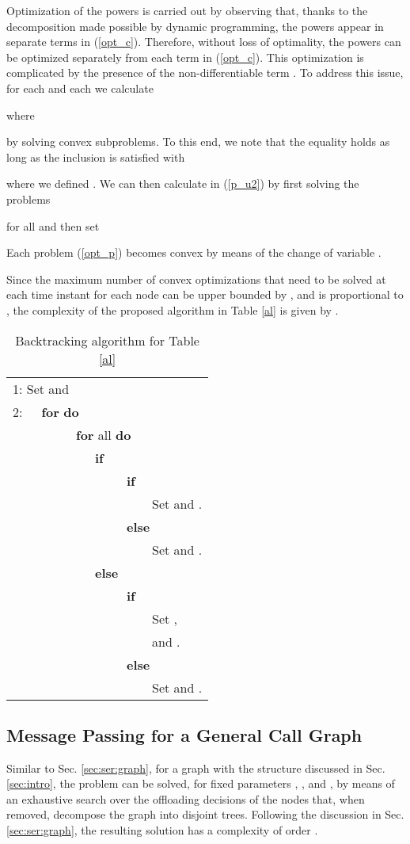 \documentclass[journal,twocolumn,10pt,twoside]{IEEEtranTCOM}
\theoremstyle{plain}
\theoremstyle{plain}
\theoremstyle{remark}
\begin{document}
Optimization of the powers is carried out by observing that, thanks to the decomposition made possible by dynamic programming, the powers   appear in separate terms in (\ref{opt_c}). Therefore, without loss of optimality, the powers  can be optimized separately from each term in (\ref{opt_c}). This optimization is complicated by the presence of the non-differentiable term  . To address this issue, for each  and each  we calculate

where

by solving  convex subproblems. To this end, we note that the equality  holds as long as the inclusion  is satisfied with
 
where we defined . We can then calculate  in (\ref{p_u2}) by first solving the problems

for all  and then set

Each problem (\ref{opt_p}) becomes convex by means of the change of variable  \cite{bar}.

Since the maximum number of convex optimizations that need to be solved at each time instant for each node can be upper bounded by , and  is proportional to , the complexity of the proposed algorithm in Table \ref{al} is given by .
\begin{table}
 \caption{Backtracking algorithm for Table \ref{al}}\label{trace}
\begin{tabular}{l}
\hline
1: Set  and \\
2:~~~\textbf{for}  \textbf{do} \\
~~~~~~~~~~\textbf{for} all  \textbf{do} \\
~~~~~~~~~~~~~\textbf{if} \\
~~~~~~~~~~~~~~~~~~\textbf{if} \\
~~~~~~~~~~~~~~~~~~~~~~Set  and  .\\
~~~~~~~~~~~~~~~~~~\textbf{else}\\
~~~~~~~~~~~~~~~~~~~~~~Set  and  .\\
~~~~~~~~~~~~~\textbf{else}\\
~~~~~~~~~~~~~~~~~~\textbf{if} \\
~~~~~~~~~~~~~~~~~~~~~~Set , \\
~~~~~~~~~~~~~~~~~~~~~~and   .\\
~~~~~~~~~~~~~~~~~~\textbf{else}\\
~~~~~~~~~~~~~~~~~~~~~~Set  and  .\\
\hline
\end{tabular}
\end{table}
\subsection{Message Passing for a General Call Graph}
\label{sec:par:gen}
Similar to Sec. \ref{sec:ser:graph}, for a graph with the structure discussed in Sec. \ref{sec:intro}, the problem  can be solved, for fixed parameters , ,  and , by means of an exhaustive search over the offloading decisions of the nodes that, when removed, decompose the graph into disjoint trees. Following the discussion in Sec. \ref{sec:ser:graph}, the resulting solution has a complexity of order .
\end{document}
